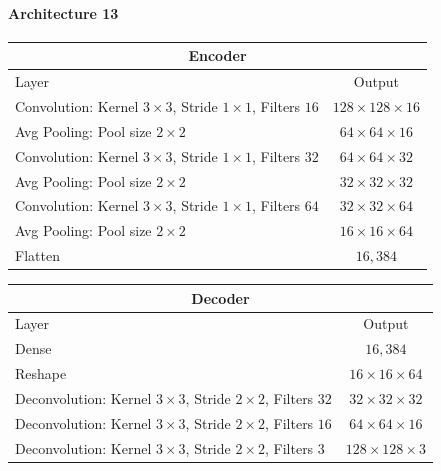 \paragraph{Architecture 13}

\begin{center}
    \begin{table}[H]
        \centering
        \begin{tabular}{ | l | c | }
            \multicolumn{2}{c}{Encoder} \\ \hline
            Layer & Output\\ \hline
            Convolution: Kernel $3\times3$, Stride $1\times1$, Filters $16 $    & $128\times 128\times 16  $    \\
            Avg Pooling: Pool size $2\times2$                                   & $64\times 64\times   16  $    \\  
            Convolution: Kernel $3\times3$, Stride $1\times1$, Filters $32 $    & $64\times 64\times   32 $    \\
            Avg Pooling: Pool size $2\times2$                                   & $32\times 32\times   32 $    \\
            Convolution: Kernel $3\times3$, Stride $1\times1$, Filters $64 $    & $32\times 32\times   64 $    \\
            Avg Pooling: Pool size $2\times2$                                   & $16\times 16\times   64 $    \\
            Flatten                                                             & $16,384$                      \\
            \hline
        \end{tabular} 
    \end{table}
\end{center}
\vspace{-4em}
\begin{center}
    \begin{table}[H]
        \centering
        \begin{tabular}{ | l | c | }
            \multicolumn{2}{c}{Decoder} \\ \hline
            Layer & Output\\ \hline
            Dense                                                                   & $16,384$                   \\
            Reshape                                                                 & $16\times 16\times  64 $  \\
            Deconvolution: Kernel $3\times3$, Stride $2\times2$, Filters $32 $      & $32\times 32\times  32 $  \\
            Deconvolution: Kernel $3\times3$, Stride $2\times2$, Filters $16 $      & $64\times 64\times  16 $  \\
            Deconvolution: Kernel $3\times3$, Stride $2\times2$, Filters $3  $      & $128\times 128\times3  $  \\
            \hline
        \end{tabular}
    \end{table}
\end{center}

